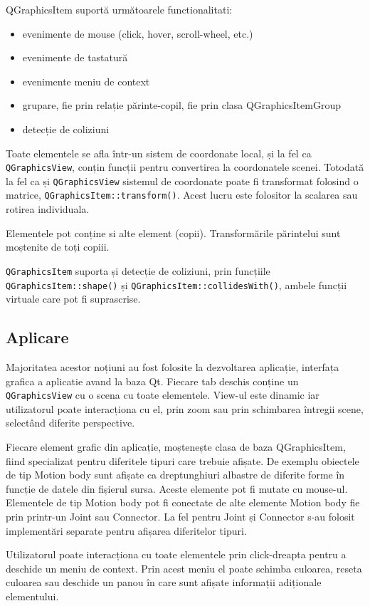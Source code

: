 \begin{itemize}
    QGraphicsItem suportă următoarele functionalitati:
    \begin{itemize}
        \item evenimente de mouse (click, hover, scroll-wheel, etc.)
        \item evenimente de tastatură
        \item evenimente meniu de context
        \item grupare, fie prin relație părinte-copil, fie prin clasa QGraphicsItemGroup
        \item detecție de coliziuni
    \end{itemize}

    Toate elementele se afla într-un sistem de coordonate local, și la fel ca \verb|QGraphicsView|, conțin funcții pentru 
    convertirea la coordonatele scenei. Totodată la fel ca și \verb|QGraphicsView| sistemul de coordonate poate fi transformat 
    folosind o matrice, \verb|QGraphicsItem::transform()|. Acest lucru este folositor la scalarea sau rotirea individuala.\newline

    Elementele pot conține si alte element (copii). Transformările părintelui sunt moștenite de toți copiii.\newline
    
    \verb|QGraphicsItem| suporta și detecție de coliziuni, prin funcțiile \verb|QGraphicsItem::shape()| și \verb|QGraphicsItem::collidesWith()|, 
    ambele funcții virtuale care pot fi suprascrise.\newline
\end{itemize}

\subsection{Aplicare}

Majoritatea acestor noțiuni au fost folosite la dezvoltarea aplicație, interfața grafica a aplicatie avand la baza Qt. 
Fiecare tab deschis conține un \verb|QGraphicsView| cu o scena cu toate elementele. 
View-ul este dinamic iar utilizatorul poate interacționa cu el, prin zoom sau prin schimbarea întregii scene, 
selectând diferite perspective.\newline 

Fiecare element grafic din aplicație, moștenește clasa de baza QGraphicsItem, 
fiind specializat pentru diferitele tipuri care trebuie afișate. De exemplu obiectele de tip Motion body sunt 
afișate ca dreptunghiuri albastre de diferite forme în funcție de datele din fișierul sursa. Aceste elemente 
pot fi mutate cu mouse-ul. Elementele de tip Motion body pot fi conectate de alte elemente Motion body fie prin 
printr-un Joint sau Connector. La fel pentru Joint și Connector s-au folosit implementări separate pentru afișarea 
diferitelor tipuri.\newline 

Utilizatorul poate interacționa cu toate elementele prin click-dreapta pentru a deschide un meniu de context. 
Prin acest meniu el poate schimba culoarea, reseta culoarea sau deschide un panou în care sunt afișate informații adiționale 
elementului.\newline






